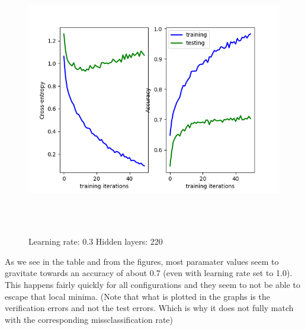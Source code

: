 \documentclass[a4paper]{article}
\begin{document}
\begin{figure}[h]
\caption{Learning rate: 0.3 Hidden layers: 220}
\centering
\includegraphics[width=15cm, height=12cm]{LR03HL220}
\end{figure}

As we see in the table and from the figures, most paramater values seem to gravitate towards an accuracy of about 0.7 (even with learning rate set to 1.0). This happens fairly quickly for all configurations and they seem to not be able to escape that local minima. (Note that what is plotted in the graphs is the verification errors and not the test errors. Which is why it does not fully match with the corresponding missclassification rate)\\\\\\
\end{document}
